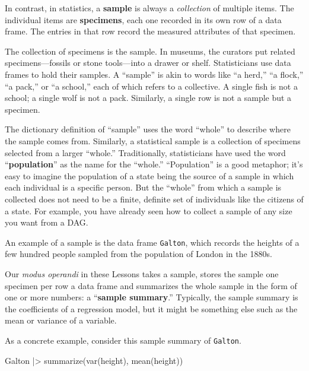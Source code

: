 \documentclass[
  letterpaper,
  DIV=11,
  numbers=noendperiod,
  oneside]{scrartcl}
\newenvironment{Shaded}{\begin{snugshade}}{\end{snugshade}}
\newcommand{\FunctionTok}[1]{\textcolor[rgb]{0.28,0.35,0.67}{#1}}
\newcommand{\NormalTok}[1]{\textcolor[rgb]{0.00,0.23,0.31}{#1}}
\newcommand{\SpecialCharTok}[1]{\textcolor[rgb]{0.37,0.37,0.37}{#1}}
\begin{document}
In contrast, in statistics, a \textbf{sample} is always a
\emph{collection} of multiple items. The individual items are
\textbf{specimens}, each one recorded in its own row of a data frame.
The entries in that row record the measured attributes of that specimen.

The collection of specimens is the sample. In museums, the curators put
related specimens---fossils or stone tools---into a drawer or shelf.
Statisticians use data frames to hold their samples. A ``sample'' is
akin to words like ``a herd,'' ``a flock,'' ``a pack,'' or ``a school,''
each of which refers to a collective. A single fish is not a school; a
single wolf is not a pack. Similarly, a single row is not a sample but a
specimen.

The dictionary definition of ``sample'' uses the word ``whole'' to
describe where the sample comes from. Similarly, a statistical sample is
a collection of specimens selected from a larger ``whole.''
Traditionally, statisticians have used the word ``\textbf{population}''
as the name for the ``whole.'' ``Population'' is a good metaphor; it's
easy to imagine the population of a state being the source of a sample
in which each individual is a specific person. But the ``whole'' from
which a sample is collected does not need to be a finite, definite set
of individuals like the citizens of a state. For example, you have
already seen how to collect a sample of any size you want from a DAG.

An example of a sample is the data frame \texttt{Galton}, which records
the heights of a few hundred people sampled from the population of
London in the 1880s.

Our \emph{modus operandi} in these Lessons takes a sample, stores the
sample one specimen per row a data frame and summarizes the whole sample
in the form of one or more numbers: a ``\textbf{sample summary}.''
Typically, the sample summary is the coefficients of a regression model,
but it might be something else such as the mean or variance of a
variable.

As a concrete example, consider this sample summary of \texttt{Galton}.

\begin{Shaded}
\begin{Highlighting}[]
\NormalTok{Galton }\SpecialCharTok{|\textgreater{}} \FunctionTok{summarize}\NormalTok{(}\FunctionTok{var}\NormalTok{(height), }\FunctionTok{mean}\NormalTok{(height))}
\end{Highlighting}
\end{Shaded}
\end{document}
